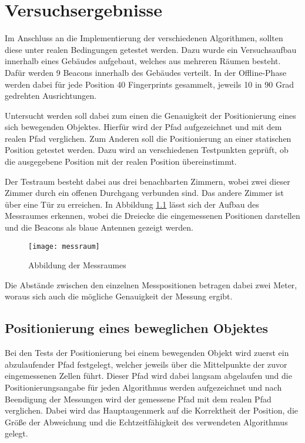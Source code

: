 \chapter{Versuchsergebnisse}
\label{chap:testing}

Im Anschluss an die Implementierung der verschiedenen Algorithmen, sollten diese unter realen Bedingungen getestet werden. 
Dazu wurde ein Versuchsaufbau innerhalb eines Gebäudes aufgebaut, welches aus mehreren Räumen besteht. Dafür werden 9 Beacons innerhalb des Gebäudes verteilt. 
In der Offline-Phase werden dabei für jede Position 40 Fingerprints gesammelt, jeweils 10 in 90 Grad gedrehten Ausrichtungen.

Untersucht werden soll dabei zum einen die Genauigkeit der Positionierung eines sich bewegenden Objektes. Hierfür wird der Pfad aufgezeichnet und mit dem realen Pfad verglichen.
Zum Anderen soll die Positionierung an einer statischen Position getestet werden. Dazu wird an verschiedenen Testpunkten geprüft, ob die ausgegebene Position mit der realen Position übereinstimmt.

Der Testraum besteht dabei aus drei benachbarten Zimmern, wobei zwei dieser Zimmer durch ein offenen Durchgang verbunden sind. Das andere Zimmer ist über eine Tür zu erreichen. 
In Abbildung \ref{messraum} lässt sich der Aufbau des Messraumes erkennen, wobei die Dreiecke die eingemessenen Positionen darstellen und die Beacons als blaue Antennen gezeigt werden.

\begin{figure}[htb!]
		\centering
	\texttt{[image: messraum]}
	\caption{Abbildung der Messraumes}
	\label{messraum}
\end{figure}

Die Abstände zwischen den einzelnen Messpositionen betragen dabei zwei Meter, woraus sich auch die mögliche Genauigkeit der Messung ergibt.

\section{Positionierung eines beweglichen Objektes}
\label{sec:testing:moving}

Bei den Tests der Positionierung bei einem bewegenden Objekt wird zuerst ein abzulaufender Pfad festgelegt, welcher jeweils über die Mittelpunkte der zuvor eingemessenen Zellen führt. Dieser Pfad wird dabei langsam abgelaufen und die Positionierungsangabe für jeden Algorithmus werden aufgezeichnet und nach Beendigung der Messungen wird der gemessene Pfad mit dem realen Pfad verglichen. Dabei wird das Hauptaugenmerk auf die Korrektheit der Position, die Größe der Abweichung und die Echtzeitfähigkeit des verwendeten Algorithmus gelegt.


